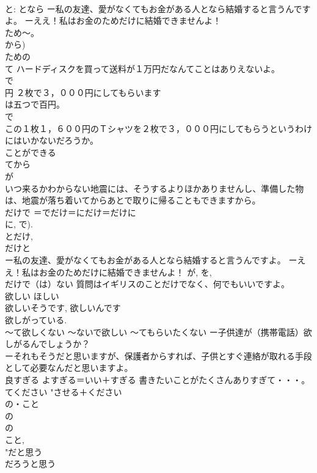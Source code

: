 \documentclass[8pt]{extreport}
\begin{document}
\begin{CJK}{UTF8}{min}
\\	と: となら ー私の友達、愛がなくてもお金がある人となら結婚すると言うんですよ。 ーええ！私はお金のためだけに結婚できませんよ！
\\	ため～。	
\\	から) 
\\	ための 
\\	て ハードディスクを買って送料が１万円だなんてことはありえないよ。 
\\	で
\\	円	２枚で３，０００円にしてもらいます 
\\	は五つで百円。 
\\	で 
\\	この１枚１，６００円のＴシャツを２枚で３，０００円にしてもらうというわけにはいかないだろうか。 
\\	ことができる	
\\	てから
\\	が 
\\	いつ来るかわからない地震には、そうするよりほかありませんし、準備した物は、地震が落ち着いてからあとで取りに帰ることもできますから。
\\	だけで	＝でだけ＝にだけ＝だけに 
\\	に, で). 
\\	とだけ, 
\\	だけと 
\\	ー私の友達、愛がなくてもお金がある人となら結婚すると言うんですよ。 ーええ！私はお金のためだけに結婚できませんよ！ が, を, 
\\	だけで（は）ない 質問はイギリスのことだけでなく、何でもいいですよ。 
\\	欲しい	ほしい 
\\	欲しいそうです, 欲しいんです 
\\	欲しがっている. 
\\	～て欲しくない ～ないで欲しい ～てもらいたくない ー子供達が（携帯電話）欲しがるんでしょうか？　
\\	ーそれもそうだと思いますが、保護者からすれば、子供とすぐ連絡が取れる手段として必要なんだと思いますよ。
\\	良すぎる	よすぎる＝いい＋すぎる 書きたいことがたくさんありすぎて・・・。　　
\\	てください	"させる＋ください 
\\	の・こと	
\\	の 
\\	の 
\\	こと, 
\\	"だと思う 
\\	だろうと思う 

\end{CJK}
\end{document}
